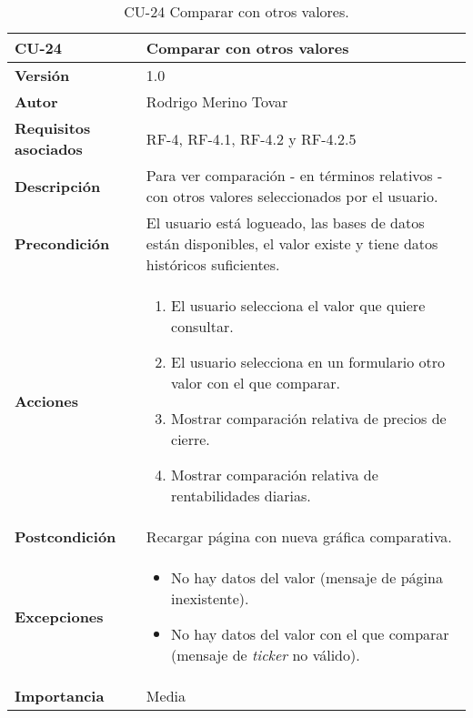 \begin{table}[p]
	\centering
	\begin{tabularx}{\linewidth}{ p{} p{} }
		\toprule
		\textbf{CU-24}    & \textbf{Comparar con otros valores}\\
		\toprule
		\textbf{Versión}              & 1.0    \\
		\textbf{Autor}                & Rodrigo Merino Tovar \\
		\textbf{Requisitos asociados} & RF-4, RF-4.1, RF-4.2 y RF-4.2.5 \\
		\textbf{Descripción}          & Para ver comparación - en términos relativos - con otros valores seleccionados por el usuario.\\
		\textbf{Precondición}         & El usuario está logueado, las bases de datos están disponibles, el valor existe y tiene datos históricos suficientes.  \\
		\textbf{Acciones}             &
		\begin{enumerate}
			\def\labelenumi{\arabic{enumi}.}
			\tightlist 
			\item El usuario selecciona el valor que quiere consultar. 
			\item El usuario selecciona en un formulario otro valor con el que comparar. 
			\item Mostrar comparación relativa de precios de cierre. 
			\item Mostrar comparación relativa de rentabilidades diarias. 
		\end{enumerate}\\
		\textbf{Postcondición}        & Recargar página con nueva gráfica comparativa. \\
		\textbf{Excepciones}          & 
		\begin{itemize}
			\tightlist
			\item No hay datos del valor (mensaje de página inexistente).
			\item No hay datos del valor con el que comparar (mensaje de \emph{ticker} no válido).
		\end{itemize} \\
		\textbf{Importancia}          & Media \\
		\bottomrule
	\end{tabularx}
	\caption{CU-24 Comparar con otros valores.}
\end{table}



